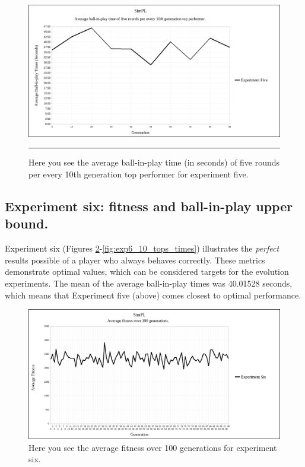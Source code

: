 \begin{figure}[htbp]  
  \centering
  \includegraphics[width=5in]{../Figures/Chapter3/exp5_10_tops_times.png}
  \rule{35em}{0.5pt}
  \caption[Experiment Five Top Performers Tournament]{Here you see the average ball-in-play time (in seconds) of five rounds per every 10th generation top performer for experiment five.}
  \label{fig:exp5_10_tops_times}
\end{figure}

\subsection[Experiment Six]{Experiment six: fitness and ball-in-play upper bound.}

Experiment six (Figures \ref{fig:exp6_avg_fit}-\ref{fig:exp6_10_tops_times}) illustrates the \textit{perfect} results possible of a player who always behaves correctly. These metrics demonstrate optimal values, which can be considered targets for the evolution experiments. The mean of the average ball-in-play times was 40.01528 seconds, which means that Experiment five (above) comes closest to optimal performance.

\begin{figure}[htbp]  
  \centering
  \includegraphics[width=5in]{../Figures/Chapter3/exp6_avg_fit.png}
  \caption[Experiment Six Average Fitness]{Here you see the average fitness over 100 generations for experiment six.}
  \label{fig:exp6_avg_fit}
\end{figure}

